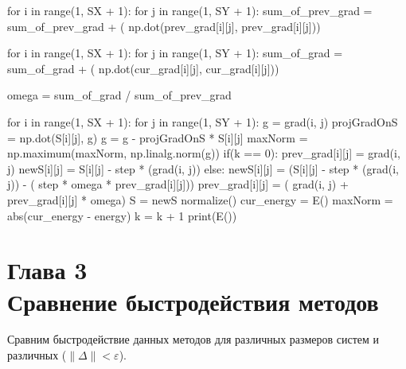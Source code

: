 \documentclass[ 12pt,x11names]{article}
\begin{document}
\begin{python}
    for i in range(1, SX + 1):
        for j in range(1, SY + 1):
            sum_of_prev_grad = sum_of_prev_grad + (
                np.dot(prev_grad[i][j], prev_grad[i][j]))

    for i in range(1, SX + 1):
        for j in range(1, SY + 1):
            sum_of_grad = sum_of_grad + (
                np.dot(cur_grad[i][j], cur_grad[i][j]))

    omega = sum_of_grad / sum_of_prev_grad

    for i in range(1, SX + 1):
        for j in range(1, SY + 1):
            g = grad(i,  j)
            projGradOnS = np.dot(S[i][j], g)
            g = g - projGradOnS * S[i][j]
            maxNorm = np.maximum(maxNorm, np.linalg.norm(g))
            if(k == 0):
                prev_grad[i][j] = grad(i, j)
                newS[i][j] = S[i][j] - step * (grad(i, j))
            else:
                newS[i][j] = (S[i][j] - step * (grad(i, j)) -
                             ( step * omega *  prev_grad[i][j]))
                prev_grad[i][j] = (
                    grad(i, j) + prev_grad[i][j] * omega)
    S = newS
    normalize()
    cur_energy = E()
    maxNorm = abs(cur_energy - energy)
    k = k + 1
print(E())

 \end{python}

\newpage
\section{Глава 3\\
Сравнение быстродействия методов}
 Сравним быстродействие данных методов для различных размеров систем и различных  ($\| \Delta \|< \varepsilon$).\\
 \\
 \\
\end{document}
